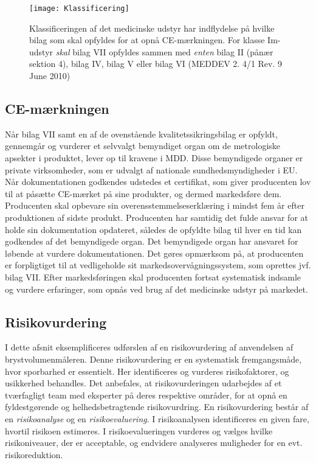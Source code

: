 {\begin{figure}[htb]
\centering
\texttt{[image: Klassificering]}
\caption{Klassificeringen af det medicinske udstyr har indflydelse på hvilke bilag som skal opfyldes for at opnå CE-mærkningen. For klasse Im-udstyr \textit{skal} bilag VII opfyldes sammen med \textit{enten} bilag II (pånær sektion 4), bilag IV, bilag V eller bilag VI (MEDDEV 2. 4/1 Rev. 9 June 2010)}
\label{fig:Klas}
\end{figure}

\subsection{CE-mærkningen}
   
Når bilag VII samt en af de ovenstående kvalitetssikringsbilag er opfyldt, gennemgår og vurderer et selvvalgt bemyndiget organ om de metrologiske apsekter i produktet, lever op til kravene i MDD. Disse bemyndigede organer er private virksomheder, som er udvalgt af nationale sundhedsmyndigheder i EU. Når dokumentationen godkendes udstedes et certifikat, som giver producenten lov til at påsætte CE-mærket på sine produkter, og dermed markedsføre dem.    
 Producenten skal opbevare sin overensstemmelseserklæring i mindst fem år efter produktionen af sidste produkt. Producenten har samtidig det fulde ansvar for at holde sin dokumentation opdateret, således de opfyldte bilag til hver en tid kan godkendes af det bemyndigede organ. Det bemyndigede organ har ansvaret for løbende at vurdere dokumentationen.
Det gøres opmærksom på, at producenten er forpligtiget til at vedligeholde sit markedsovervågningssystem, som oprettes jvf. bilag VII. Efter markedsføringen skal producenten fortsat systematisk indsamle og vurdere erfaringer, som opnås ved brug af det medicinske udstyr på markedet. 

\subsection{Risikovurdering}
I dette afsnit eksemplificeres udførslen af en risikovurdering af anvendelsen af brystvolumenmåleren. Denne risikovurdering er en systematisk fremgangsmåde, hvor sporbarhed er essentielt. Her identificeres og vurderes risikofaktorer, og usikkerhed behandles. 
Det anbefales, at risikovurderingen udarbejdes af et tværfagligt team med eksperter på deres respektive områder, for at opnå en fyldestgørende og helhedsbetragtende risikovurdring.   
En risikovurdering består af en \textit{risikoanalyse} og en \textit{risikoevaluering}. I risikoanalysen identificeres en given fare, hvortil risikoen estimeres. I risikoevalueringen vurderes og vælges hvilke risikoniveauer, der er acceptable, og endvidere analyseres muligheder for en evt. risikoreduktion.

}
